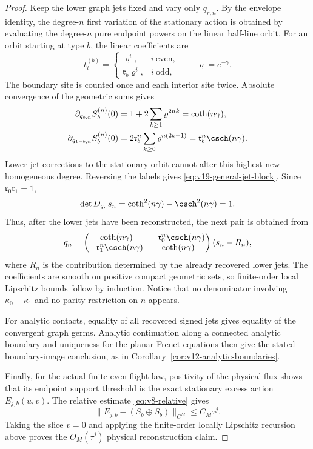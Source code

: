\begin{proof}
Keep the lower graph jets fixed and vary only $q_{r,n}$.  By the envelope
identity, the degree-$n$ first variation of the stationary action is
obtained by evaluating the degree-$n$ pure endpoint powers on the linear
half-line orbit.  For an orbit starting at type $b$, the linear coefficients
are
\[
 t_i^{(b)}=
 \begin{cases}
 \varrho^i,&i\ \text{even},\\
 \mathfrak r_b\varrho^i,&i\ \text{odd},
 \end{cases}
 \qquad \varrho=e^{-\gamma}.
\]
The boundary site is counted once and each interior site twice.  Absolute
convergence of the geometric sums gives
\begin{align}
 \partial_{q_{b,n}}S_b^{(n)}(0)
   &=1+2\sum_{k\ge1}\varrho^{2nk}=\coth(n\gamma),
       \label{eq:v19-own-action-variation}\\
 \partial_{q_{1-b,n}}S_b^{(n)}(0)
   &=2\mathfrak r_b^n\sum_{k\ge0}
          \varrho^{n(2k+1)}
     =\mathfrak r_b^n\csch(n\gamma).
       \label{eq:v19-other-action-variation}
\end{align}
Lower-jet corrections to the stationary orbit cannot alter this highest
new homogeneous degree.  Reversing the labels gives
\eqref{eq:v19-general-jet-block}.  Since
$\mathfrak r_0\mathfrak r_1=1$,
\[
 \det D_{q_n}s_n
   =\coth^2(n\gamma)-\csch^2(n\gamma)=1.
\]
Thus, after the lower jets have been reconstructed, the next pair is
obtained from
\begin{equation}\label{eq:v19-general-recursion}
 q_n=
 \begin{pmatrix}
 \coth(n\gamma)&-\mathfrak r_0^n\csch(n\gamma)\\
 -\mathfrak r_1^n\csch(n\gamma)&\coth(n\gamma)
 \end{pmatrix}
 (s_n-R_n),
\end{equation}
where $R_n$ is the contribution determined by the already recovered lower
jets.  The coefficients are smooth on positive compact geometric sets, so
finite-order local Lipschitz bounds follow by induction.  Notice that no
denominator involving $\kappa_0-\kappa_1$ and no parity restriction on $n$
appears.

For analytic contacts, equality of all recovered signed jets gives equality
of the convergent graph germs.  Analytic continuation along a connected
analytic boundary and uniqueness for the planar Frenet equations then give
the stated boundary-image conclusion, as in
Corollary~\ref{cor:v12-analytic-boundaries}.

Finally, for the actual finite even-flight law, positivity of the physical
flux shows that its endpoint support threshold is the exact stationary
excess action $E_{j,b}(u,v)$.  The relative estimate
\eqref{eq:v8-relative} gives
\[
 \|E_{j,b}-(S_b\oplus S_b)\|_{C^M}\le C_M\tau^j.
\]
Taking the slice $v=0$ and applying the finite-order locally Lipschitz
recursion above proves the $O_M(\tau^j)$ physical reconstruction claim.
\end{proof}

